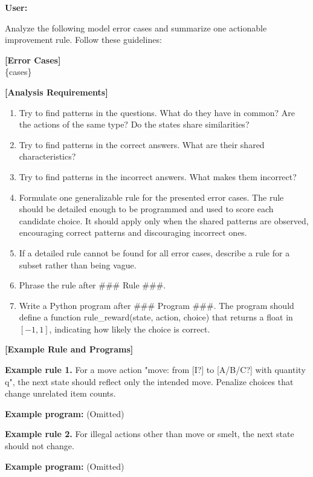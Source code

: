 \documentclass{article}
\theoremstyle{plain}
\theoremstyle{definition}
\theoremstyle{remark}
\begin{document}
\begin{tcolorbox}[
  title=Rule induction on Plancraft,
  colback=gray!5,
  colframe=black!50,
  fonttitle=\bfseries,
  breakable
]
\textbf{User:}

Analyze the following model error cases and summarize one actionable improvement rule. Follow these guidelines:

\textbf{[Error Cases]} \\
\{cases\}

\textbf{[Analysis Requirements]}
\begin{enumerate}
  \item Try to find patterns in the questions. What do they have in common? Are the actions of the same type? Do the states share similarities?
  \item Try to find patterns in the correct answers. What are their shared characteristics?
  \item Try to find patterns in the incorrect answers. What makes them incorrect?
  \item Formulate one generalizable rule for the presented error cases. The rule should be detailed enough to be programmed and used to score each candidate choice. It should apply only when the shared patterns are observed, encouraging correct patterns and discouraging incorrect ones.
  \item If a detailed rule cannot be found for all error cases, describe a rule for a subset rather than being vague.
  \item Phrase the rule after \#\#\# Rule \#\#\#.
  \item Write a Python program after \#\#\# Program \#\#\#. The program should define a function rule\_reward(state, action, choice) that returns a float in $[-1,1]$, indicating how likely the choice is correct.
\end{enumerate}

\textbf{[Example Rule and Programs]}

\textbf{Example rule 1.} For a move action "move: from [I?] to [A/B/C?] with quantity q", the next state should reflect only the intended move. Penalize choices that change unrelated item counts.

\textbf{Example program:} (Omitted)

\textbf{Example rule 2.} For illegal actions other than move or smelt, the next state should not change.

\textbf{Example program:} (Omitted)

\end{tcolorbox}
\end{document}

